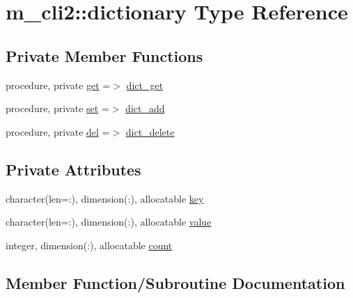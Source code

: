 \hypertarget{structm__cli2_1_1dictionary}{}\section{m\+\_\+cli2\+:\+:dictionary Type Reference}
\label{structm__cli2_1_1dictionary}
\subsection*{Private Member Functions}
\begin{DoxyCompactItemize}
\item 
procedure, private \mbox{\hyperlink{structm__cli2_1_1dictionary_adbb2dc99f5c4b6a1c8d5c436099915b9}{get}} =$>$ \mbox{\hyperlink{namespacem__cli2_a5b489c992f1434fa27e7858a483a38c7}{dict\+\_\+get}}
\item 
procedure, private \mbox{\hyperlink{structm__cli2_1_1dictionary_abbab4e9611ce7321d1ac616f927ec6a7}{set}} =$>$ \mbox{\hyperlink{namespacem__cli2_a601a06b7038b524abababc8d437ee823}{dict\+\_\+add}}
\item 
procedure, private \mbox{\hyperlink{structm__cli2_1_1dictionary_a59e33075f498d558261cdc11151f8578}{del}} =$>$ \mbox{\hyperlink{namespacem__cli2_afcdd2c59305faf341ebf8ec3b115a05e}{dict\+\_\+delete}}
\end{DoxyCompactItemize}
\subsection*{Private Attributes}
\begin{DoxyCompactItemize}
\item 
character(len=\+:), dimension(\+:), allocatable \mbox{\hyperlink{structm__cli2_1_1dictionary_a440bacfa9df210c811bef9fc3eab49ea}{key}}
\item 
character(len=\+:), dimension(\+:), allocatable \mbox{\hyperlink{structm__cli2_1_1dictionary_a98cb2cb87235406680f49943b46dc2d0}{value}}
\item 
integer, dimension(\+:), allocatable \mbox{\hyperlink{structm__cli2_1_1dictionary_a0438b69609c55139b6a812f05081338f}{count}}
\end{DoxyCompactItemize}


\subsection{Member Function/\+Subroutine Documentation}
\mbox{\label{structm__cli2_1_1dictionary_a59e33075f498d558261cdc11151f8578}} 
